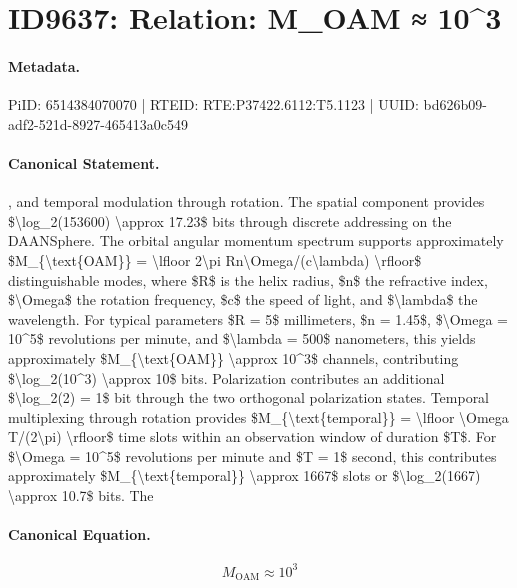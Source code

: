 \section*{ID9637: Relation: M\_OAM ≈ 10\textasciicircum{}3}
\paragraph{Metadata.}
PiID: 6514384070070 | RTEID: RTE:P37422.6112:T5.1123 | UUID: bd626b09-adf2-521d-8927-465413a0c549

\paragraph{Canonical Statement.}
, and temporal modulation through rotation. The spatial component provides \$\textbackslash{}log\_2(153600) \textbackslash{}approx 17.23\$ bits through discrete addressing on the DAANSphere. The orbital angular momentum spectrum supports approximately \$M\_\{\textbackslash{}text\{OAM\}\} = \textbackslash{}lfloor 2\textbackslash{}pi Rn\textbackslash{}Omega/(c\textbackslash{}lambda) \textbackslash{}rfloor\$ distinguishable modes, where \$R\$ is the helix radius, \$n\$ the refractive index, \$\textbackslash{}Omega\$ the rotation frequency, \$c\$ the speed of light, and \$\textbackslash{}lambda\$ the wavelength. For typical parameters \$R = 5\$ millimeters, \$n = 1.45\$, \$\textbackslash{}Omega = 10\textasciicircum{}5\$ revolutions per minute, and \$\textbackslash{}lambda = 500\$ nanometers, this yields approximately \$M\_\{\textbackslash{}text\{OAM\}\} \textbackslash{}approx 10\textasciicircum{}3\$ channels, contributing \$\textbackslash{}log\_2(10\textasciicircum{}3) \textbackslash{}approx 10\$ bits. Polarization contributes an additional \$\textbackslash{}log\_2(2) = 1\$ bit through the two orthogonal polarization states. Temporal multiplexing through rotation provides \$M\_\{\textbackslash{}text\{temporal\}\} = \textbackslash{}lfloor \textbackslash{}Omega T/(2\textbackslash{}pi) \textbackslash{}rfloor\$ time slots within an observation window of duration \$T\$. For \$\textbackslash{}Omega = 10\textasciicircum{}5\$ revolutions per minute and \$T = 1\$ second, this contributes approximately \$M\_\{\textbackslash{}text\{temporal\}\} \textbackslash{}approx 1667\$ slots or \$\textbackslash{}log\_2(1667) \textbackslash{}approx 10.7\$ bits. The

\paragraph{Canonical Equation.}
\[
M_{\text{OAM}} \approx 10^3
\]

